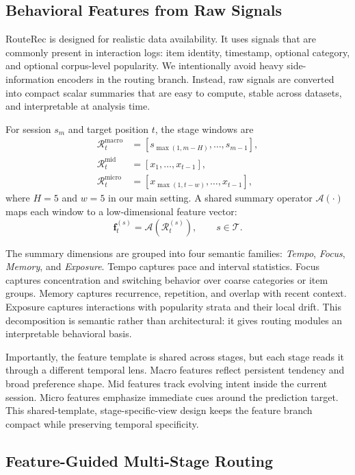 \documentclass[sigconf,anonymous,review]{acmart-primary/acmart}
\begin{document}
\subsection{Behavioral Features from Raw Signals}
\label{sec:feature-construction}

RouteRec is designed for realistic data availability. It uses signals that are commonly present in interaction logs: item identity, timestamp, optional category, and optional corpus-level popularity. We intentionally avoid heavy side-information encoders in the routing branch. Instead, raw signals are converted into compact scalar summaries that are easy to compute, stable across datasets, and interpretable at analysis time.

For session $s_m$ and target position $t$, the stage windows are
\begin{align}
\mathcal{R}^{\mathrm{macro}}_t &= [s_{\max(1,m-H)},\dots,s_{m-1}], \\
\mathcal{R}^{\mathrm{mid}}_t &= [x_1,\dots,x_{t-1}], \\
\mathcal{R}^{\mathrm{micro}}_t &= [x_{\max(1,t-w)},\dots,x_{t-1}],
\end{align}
where $H=5$ and $w=5$ in our main setting. A shared summary operator $\mathcal{A}(\cdot)$ maps each window to a low-dimensional feature vector:
\[
\mathbf{f}^{(s)}_t=\mathcal{A}(\mathcal{R}^{(s)}_t),\qquad s\in\mathcal{T}.
\]

The summary dimensions are grouped into four semantic families: \textit{Tempo}, \textit{Focus}, \textit{Memory}, and \textit{Exposure}. Tempo captures pace and interval statistics. Focus captures concentration and switching behavior over coarse categories or item groups. Memory captures recurrence, repetition, and overlap with recent context. Exposure captures interactions with popularity strata and their local drift. This decomposition is semantic rather than architectural: it gives routing modules an interpretable behavioral basis.

Importantly, the feature template is shared across stages, but each stage reads it through a different temporal lens. Macro features reflect persistent tendency and broad preference shape. Mid features track evolving intent inside the current session. Micro features emphasize immediate cues around the prediction target. This shared-template, stage-specific-view design keeps the feature branch compact while preserving temporal specificity.

\subsection{Feature-Guided Multi-Stage Routing}
\end{document}
